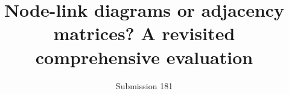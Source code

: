 

\title{Node-link diagrams or adjacency matrices? A revisited comprehensive evaluation}

\author{Submission 181}

%





\maketitle









%





